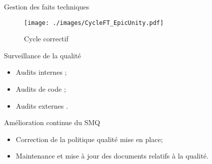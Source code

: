 	\begin{frame}{Gestion des faits techniques}
\begin{figure}
	\centering
	\texttt{[image: ./images/CycleFT\_EpicUnity.pdf]}
	\caption{Cycle correctif}
	\end{figure}
	\end{frame}
	
	\begin{frame}{Surveillance de la qualité}
	\begin{itemize}
	 \item Audits internes ;
	 \item Audits de code ;
	 \item Audits externes .
	\end{itemize}
	\end{frame}
	
	\begin{frame}{Amélioration continue du SMQ}
	\begin{itemize}
	 \item Correction de la politique qualité mise en place;
	 \item Maintenance et mise à jour des documents relatifs à la qualité.
	\end{itemize}
	\end{frame}
